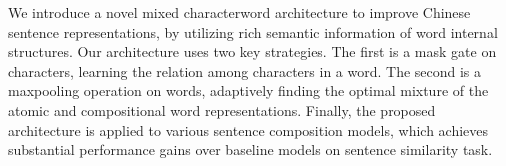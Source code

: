 We introduce a novel mixed characterword architecture to improve Chinese sentence representations, by utilizing rich semantic information of word internal structures. Our architecture uses two key strategies. The first is a mask gate on characters, learning the relation among characters in a word. The second is a maxpooling operation on words, adaptively finding the optimal mixture of the atomic and compositional word representations. Finally, the proposed architecture is applied to various sentence composition models, which achieves substantial performance gains over baseline models on sentence similarity task.
